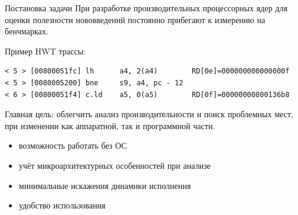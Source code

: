 \documentclass[10pt,aspectratio=169,hyperref={pdftex,unicode},xcolor=dvipsnames]{beamer}
\begin{document}
\begin{frame}[fragile]{ Постановка задачи }
    При разработке производительных процессорных ядер для оценки полезности
    нововведений постоянно прибегают к измерению на бенчмарках.



    Пример HWT трассы:
\begin{verbatim}
< 5 > [00800051fc] lh      a4, 2(a4)        RD[0e]=000000000000000f
< 5 > [0080005200] bne     s9, a4, pc - 12
< 6 > [00800051f4] c.ld    a5, 0(a5)        RD[0f]=00000000800136b8
\end{verbatim}

    Главная цель: облегчить анализ производительности и поиск проблемных мест,
    при изменении как аппаратной, так и программной части.


    \begin{itemize}
        \pause \item возможность работать без ОС
        \pause \item учёт микроархитектурных особенностей при анализе
        \pause \item минимальные искажения динамики исполнения
        \pause \item удобство использования
    \end{itemize}
\end{frame}
\end{document}

